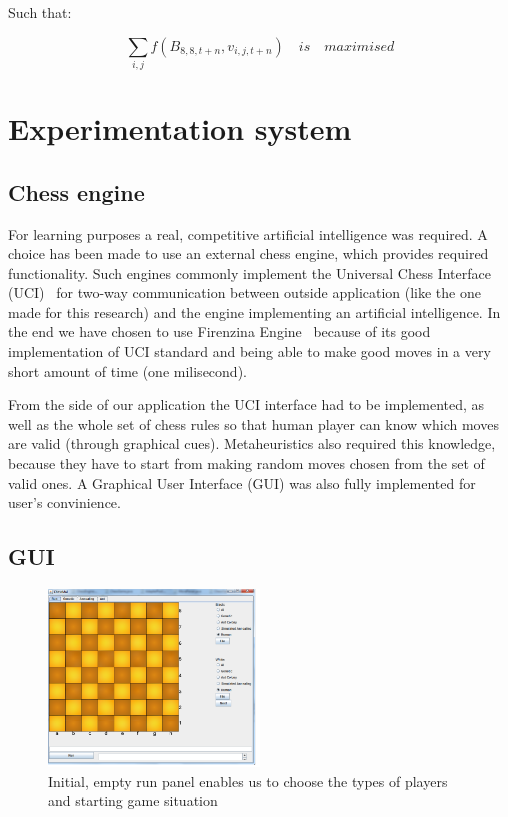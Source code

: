 \documentclass[pdftex]{article}
\begin{document}
Such that:

\begin{equation}
\label{eq:costfunction}
	\sum_{i,j} f(B_{8,8,t+n},v_{i,j,t+n}) \quad is \quad maximised
\end{equation}


\section{Experimentation system}
\label{sec:project}

\subsection{Chess engine}
\label{sec:engine}

For learning purposes a real, competitive artificial intelligence was required. A choice has been made to use an external chess engine, which provides required functionality. Such engines commonly implement the Universal Chess Interface (UCI)~\cite{uci} for two-way communication between outside application (like the one made for this research) and the engine implementing an artificial intelligence. 
In the end we have chosen to use Firenzina Engine~\cite{firenzina} because of its good implementation of UCI standard and being able to make good moves in a very short amount of time (one milisecond).

From the side of our application the UCI interface had to be implemented, as well as the whole set of chess rules so that human player can know which moves are valid (through graphical cues). Metaheuristics also required this knowledge, because they have to start from making random moves chosen from the set of valid ones. A Graphical User Interface (GUI) was also fully implemented for user's convinience.

\subsection{GUI}
\label{sec:uci}

\begin{figure}[!htb]
	\centering
	\includegraphics[width=0.5\textwidth]{chessImages/Initial.png} 
	\caption{Initial, empty run panel enables us to choose the types of players and starting game situation}
	\label{fig:initialRunPanel}
\end{figure}
\end{document}
